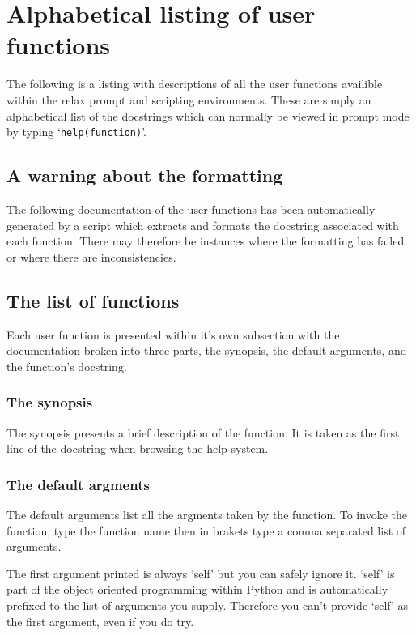 
\chapter{Alphabetical listing of user functions}

The following is a listing with descriptions of all the user functions availible within the relax prompt and scripting environments.  These are simply an alphabetical list of the docstrings which can normally be viewed in prompt mode by typing `\texttt{help(function)}'.





\section{A warning about the formatting}

The following documentation of the user functions has been automatically generated by a script which extracts and formats the docstring associated with each function.  There may therefore be instances where the formatting has failed or where there are inconsistencies.




\section{The list of functions}

Each user function is presented within it's own subsection with the documentation broken into three parts, the synopsis, the default arguments, and the function's docstring.


\subsection{The synopsis}

The synopsis presents a brief description of the function.  It is taken as the first line of the docstring when browsing the help system.


\subsection{The default argments}

The default arguments list all the argments taken by the function.  To invoke the function, type the function name then in brakets type a comma separated list of arguments.

The first argument printed is always `self' but you can safely ignore it.  `self' is part of the object oriented programming within Python and is automatically prefixed to the list of arguments you supply.  Therefore you can't provide `self' as the first argument, even if you do try.



